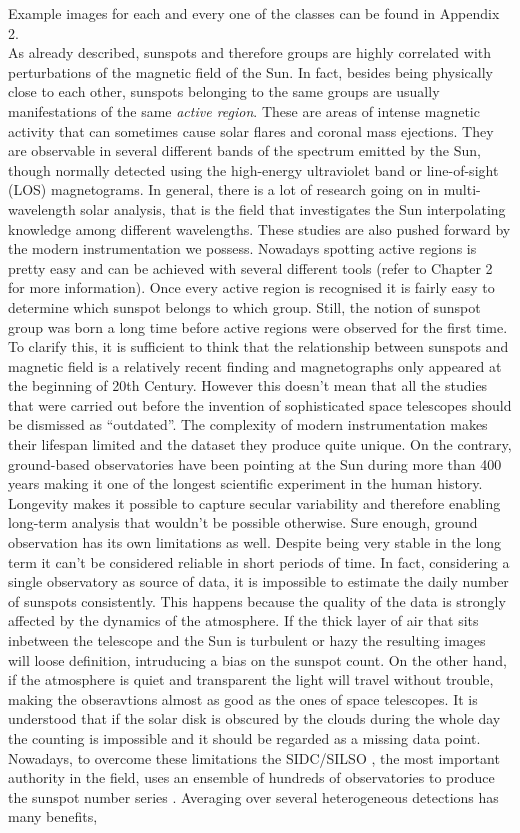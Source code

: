 Example images for each and every one of the classes can be found in Appendix 2.\\
As already described, sunspots and therefore groups are highly correlated with perturbations of the magnetic field of the Sun. In fact, besides being physically close to each other, sunspots belonging to the same groups are usually manifestations of the same \textit{active region}. These are areas of intense magnetic activity that can sometimes cause solar flares and coronal mass ejections. They are observable in several different bands of the spectrum emitted by the Sun, though normally detected using the high-energy ultraviolet band or line-of-sight (LOS) magnetograms. In general, there is a lot of research going on in multi-wavelength solar analysis, that is the field that investigates the Sun interpolating knowledge among different wavelengths. These studies are also pushed forward by the modern instrumentation we possess. Nowadays spotting active regions is pretty easy and can be achieved with several different tools (refer to Chapter 2 for more information). Once every active region is recognised it is fairly easy to determine which sunspot belongs to which group. Still, the notion of sunspot group was born a long time before active regions were observed for the first time. To clarify this, it is sufficient to think that the relationship between sunspots and magnetic field is a relatively recent finding and magnetographs only appeared at the beginning of 20th Century. However this doesn't mean that all the studies that were carried out before the invention of sophisticated space telescopes should be dismissed as ``outdated''. The complexity of modern instrumentation makes their lifespan limited and the dataset they produce quite unique. On the contrary, ground-based observatories have been pointing at the Sun during more than 400 years making it one of the longest scientific experiment in the human history. Longevity makes it possible to capture secular variability and therefore enabling long-term analysis that wouldn't be possible otherwise. Sure enough, ground observation has its own limitations as well. Despite being very stable in the long term it can't be considered reliable in short periods of time. In fact, considering a single observatory as source of data, it is impossible to estimate the daily number of sunspots consistently. This happens because the quality of the data is strongly affected by the dynamics of the atmosphere. If the thick layer of air that sits inbetween the telescope and the Sun is turbulent or hazy the resulting images will loose definition, intruducing a bias on the sunspot count. On the other hand, if the atmosphere is quiet and transparent the light will travel without trouble, making the obseravtions almost as good as the ones of space telescopes. It is understood that if the solar disk is obscured by the clouds during the whole day the counting is impossible and it should be regarded as a missing data point. Nowadays, to overcome these limitations the SIDC/SILSO \cite{sidc-silso}, the most important authority in the field, uses an ensemble of hundreds of observatories to produce the sunspot number series \cite{Clette2015}. Averaging over several heterogeneous detections has many benefits, 